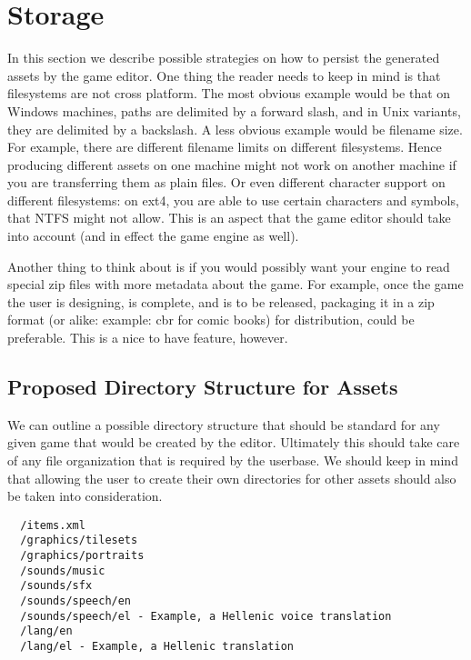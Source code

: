 \section{Storage}

In this section we describe possible strategies on how to persist the generated
assets by the game editor. One thing the reader needs to keep in mind is that
filesystems are not cross platform. The most obvious example would be that on
Windows machines, paths are delimited by a forward slash, and in Unix variants,
they are delimited by a backslash. A less obvious example would be filename
size. For example, there are different filename limits on different filesystems.
Hence producing different assets on one machine might not work on another
machine if you are transferring them as plain files. Or even different character
support on different filesystems: on ext4, you are able to use certain
characters and symbols, that NTFS might not allow. This is an aspect that the
game editor should take into account (and in effect the game engine as well).

Another thing to think about is if you would possibly want your engine to read
special zip files with more metadata about the game. For example, once the game
the user is designing, is complete, and is to be released, packaging it in a zip
format (or alike: example: cbr for comic books) for distribution, could be 
preferable. This is a nice to have feature, however.

\subsection{Proposed Directory Structure for Assets}

We can outline a possible directory structure that should be standard for any
given game that would be created by the editor. Ultimately this should take
care of any file organization that is required by the userbase. We should keep
in mind that allowing the user to create their own directories for other assets
should also be taken into consideration.

\begin{lstlisting}
  /items.xml
  /graphics/tilesets
  /graphics/portraits
  /sounds/music
  /sounds/sfx
  /sounds/speech/en
  /sounds/speech/el - Example, a Hellenic voice translation
  /lang/en
  /lang/el - Example, a Hellenic translation
\end{lstlisting}

